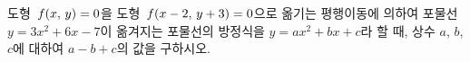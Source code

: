 도형~$f(x,\mkern3mu y)=0$을 도형~$f(x-2,\mkern3mu y+3)=0$으로 옮기는 평행이동에 의하여 포물선~$y=3x^2+6x-7$이 옮겨지는 포물선의 방정식을 $y=ax^2+bx+c$라 할 때, 상수 $a$, $b$, $c$에 대하여 $a-b+c$의 값을 구하시오.
